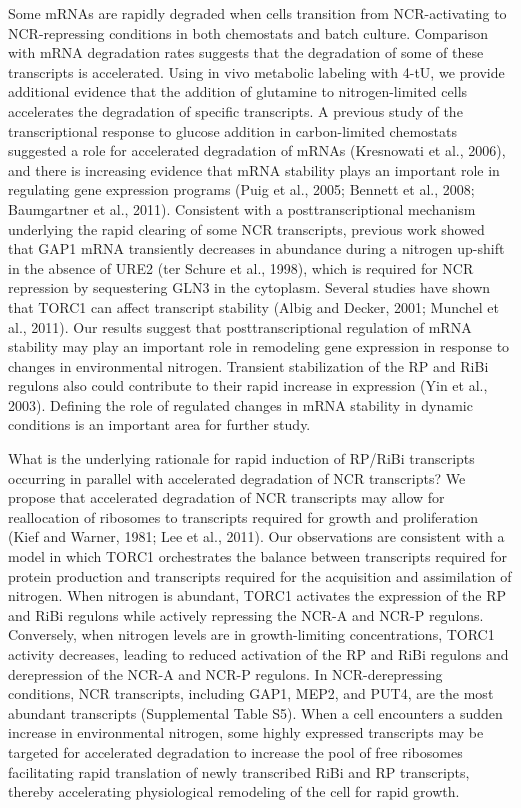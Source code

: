 Some mRNAs are rapidly degraded when cells
transition from NCR-activating to NCR-repressing conditions in both
chemostats and batch culture. Comparison with mRNA degradation rates
suggests that the degradation of some of these transcripts is
accelerated. Using in vivo metabolic labeling with 4-tU, we provide
additional evidence that the addition of glutamine to nitrogen-limited
cells accelerates the degradation of specific transcripts. A previous
study of the transcriptional response to glucose addition in
carbon-limited chemostats suggested a role for accelerated degradation
of mRNAs (Kresnowati et al., 2006), and there is increasing evidence
that mRNA stability plays an important role in regulating gene
expression programs (Puig et al., 2005; Bennett et al., 2008;
Baumgartner et al., 2011). Consistent with a posttranscriptional
mechanism underlying the rapid clearing of some NCR transcripts,
previous work showed that GAP1 mRNA transiently decreases in abundance
during a nitrogen up-shift in the absence of URE2 (ter Schure et al.,
1998), which is required for NCR repression by sequestering GLN3 in
the cytoplasm. Several studies have shown that TORC1 can affect
transcript stability (Albig and Decker, 2001; Munchel et al., 2011).
Our results suggest that posttranscriptional regulation of mRNA
stability may play an important role in remodeling gene expression in
response to changes in environmental nitrogen. Transient stabilization
of the RP and RiBi regulons also could contribute to their rapid
increase in expression (Yin et al., 2003). Defining the role of
regulated changes in mRNA stability in dynamic conditions is an
important area for further study. 

What is the underlying rationale
for rapid induction of RP/RiBi transcripts occurring in parallel with
accelerated degradation of NCR transcripts? We propose that
accelerated degradation of NCR transcripts may allow for reallocation
of ribosomes to transcripts required for growth and proliferation
(Kief and Warner, 1981; Lee et al., 2011). Our observations are
consistent with a model in which TORC1 orchestrates the balance
between transcripts required for protein production and transcripts
required for the acquisition and assimilation of nitrogen. When
nitrogen is abundant, TORC1 activates the expression of the RP and
RiBi regulons while actively repressing the NCR-A and NCR-P regulons.
Conversely, when nitrogen levels are in growth-limiting
concentrations, TORC1 activity decreases, leading to reduced
activation of the RP and RiBi regulons and derepression of the NCR-A
and NCR-P regulons. In NCR-derepressing conditions, NCR transcripts,
including GAP1, MEP2, and PUT4, are the most abundant transcripts
(Supplemental Table S5). When a cell encounters a sudden increase in
environmental nitrogen, some highly expressed transcripts may be
targeted for accelerated degradation to increase the pool of free
ribosomes facilitating rapid translation of newly transcribed RiBi and
RP transcripts, thereby accelerating physiological remodeling of the
cell for rapid growth.  


